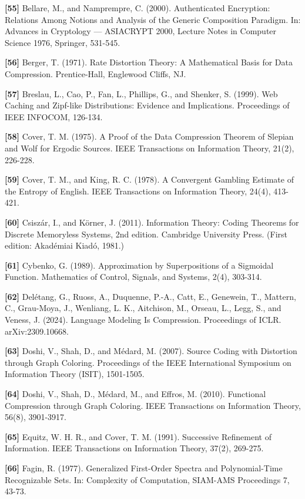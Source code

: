 \documentclass[
]{article}
\begin{document}
\textbf{{[}55{]}} Bellare, M., and Namprempre, C. (2000). Authenticated
Encryption: Relations Among Notions and Analysis of the Generic
Composition Paradigm. In: Advances in Cryptology --- ASIACRYPT 2000,
Lecture Notes in Computer Science 1976, Springer, 531-545.

\textbf{{[}56{]}} Berger, T. (1971). Rate Distortion Theory: A
Mathematical Basis for Data Compression. Prentice-Hall, Englewood
Cliffs, NJ.

\textbf{{[}57{]}} Breslau, L., Cao, P., Fan, L., Phillips, G., and
Shenker, S. (1999). Web Caching and Zipf-like Distributions: Evidence
and Implications. Proceedings of IEEE INFOCOM, 126-134.

\textbf{{[}58{]}} Cover, T. M. (1975). A Proof of the Data Compression
Theorem of Slepian and Wolf for Ergodic Sources. IEEE Transactions on
Information Theory, 21(2), 226-228.

\textbf{{[}59{]}} Cover, T. M., and King, R. C. (1978). A Convergent
Gambling Estimate of the Entropy of English. IEEE Transactions on
Information Theory, 24(4), 413-421.

\textbf{{[}60{]}} Csisz\'ar, I., and K\"orner, J. (2011). Information
Theory: Coding Theorems for Discrete Memoryless Systems, 2nd edition.
Cambridge University Press. (First edition: Akad\'emiai Kiad\'o, 1981.)

\textbf{{[}61{]}} Cybenko, G. (1989). Approximation by Superpositions
of a Sigmoidal Function. Mathematics of Control, Signals, and Systems,
2(4), 303-314.

\textbf{{[}62{]}} Del\'etang, G., Ruoss, A., Duquenne, P.-A., Catt, E.,
Genewein, T., Mattern, C., Grau-Moya, J., Wenliang, L. K.,
Aitchison, M., Orseau, L., Legg, S., and Veness, J. (2024). Language
Modeling Is Compression. Proceedings of ICLR. arXiv:2309.10668.

\textbf{{[}63{]}} Doshi, V., Shah, D., and M\'edard, M. (2007). Source
Coding with Distortion through Graph Coloring. Proceedings of the IEEE
International Symposium on Information Theory (ISIT), 1501-1505.

\textbf{{[}64{]}} Doshi, V., Shah, D., M\'edard, M., and Effros, M.
(2010). Functional Compression through Graph Coloring. IEEE
Transactions on Information Theory, 56(8), 3901-3917.

\textbf{{[}65{]}} Equitz, W. H. R., and Cover, T. M. (1991). Successive
Refinement of Information. IEEE Transactions on Information Theory,
37(2), 269-275.

\textbf{{[}66{]}} Fagin, R. (1977). Generalized First-Order Spectra and
Polynomial-Time Recognizable Sets. In: Complexity of Computation,
SIAM-AMS Proceedings 7, 43-73.
\end{document}
